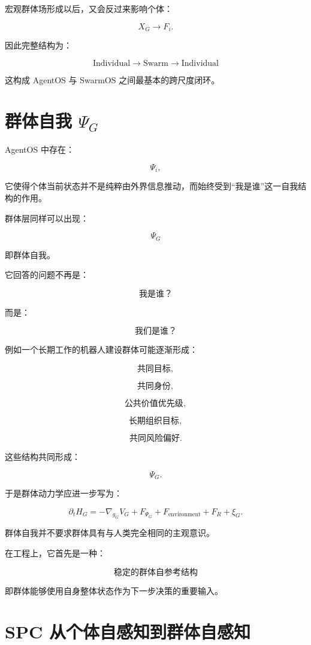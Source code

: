 宏观群体场形成以后，又会反过来影响个体：

\[
X_G
\rightarrow
F_i.
\]

因此完整结构为：

\[
\boxed{
\text{Individual}
\rightarrow
\text{Swarm}
\rightarrow
\text{Individual}
}
\]

这构成 AgentOS 与 SwarmOS 之间最基本的跨尺度闭环。


\section{群体自我 $\Psi_G$}

AgentOS 中存在：

\[
\Psi_i,
\]

它使得个体当前状态并不是纯粹由外界信息推动，而始终受到``我是谁''这一自我结构的作用。

群体层同样可以出现：

\[
\boxed{
\Psi_G
}
\]

即群体自我。

它回答的问题不再是：

\[
\text{我是谁？}
\]

而是：

\[
\boxed{
\text{我们是谁？}
}
\]

例如一个长期工作的机器人建设群体可能逐渐形成：

\[
\text{共同目标},
\]

\[
\text{共同身份},
\]

\[
\text{公共价值优先级},
\]

\[
\text{长期组织目标},
\]

\[
\text{共同风险偏好}.
\]

这些结构共同形成：

\[
\Psi_G.
\]

于是群体动力学应进一步写为：

\[
\partial_t H_G
=
-\nabla_{g_G}V_G
+
F_{\Psi_G}
+
F_{\mathrm{environment}}
+
F_R
+
\xi_G.
\]

群体自我并不要求群体具有与人类完全相同的主观意识。

在工程上，它首先是一种：

\[
\boxed{
\text{稳定的群体自参考结构}
}
\]

即群体能够使用自身整体状态作为下一步决策的重要输入。


\section{SPC 从个体自感知到群体自感知}

